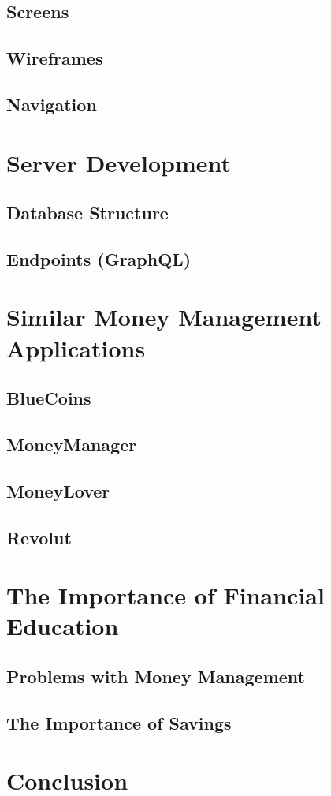 \documentclass[12pt,a4paper]{book}
\theoremstyle{definition}
\theoremstyle{remark}
\begin{document}
    \section{Screens}
    \section{Wireframes}
    \section{Navigation}

\chapter{Server Development}
    \section{Database Structure}
    \section{Endpoints (GraphQL)}

\chapter{Similar Money Management Applications}
    \section{BlueCoins}
    \section{MoneyManager}
    \section{MoneyLover}
    \section{Revolut}

\chapter{The Importance of Financial Education}
    \section{Problems with Money Management}
    \section{The Importance of Savings}

\chapter{Conclusion}


\end{document}
